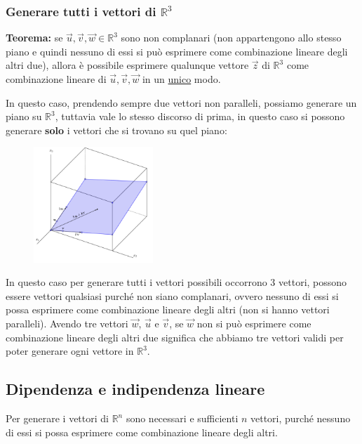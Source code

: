 \documentclass[../main.tex]{subfiles}
\begin{document}
\pagebreak
\subsubsection{Generare tutti i vettori di $\mathbb{R}^3$}
\textbf{Teorema:} se $\vec{u},\vec{v},\vec{w} \in \mathbb{R}^3$ sono non complanari (non appartengono allo stesso piano e quindi nessuno di essi si può  esprimere come combinazione lineare degli altri due), allora è possibile esprimere qualunque vettore $\vec{z}$ di $\mathbb{R}^3$ come combinazione lineare di $\vec{u},\vec{v},\vec{w}$ in un \underline{unico} modo.

In questo caso, prendendo sempre due vettori non paralleli, possiamo generare un piano su $\mathbb{R}^3$, tuttavia vale lo stesso discorso di prima, in questo caso si possono generare \textbf{solo} i vettori che si trovano su quel piano:
\begin{figure}[h]
    \centering
    \includegraphics[width=0.4\textwidth]{../images/combinazioneLineareR3.png}
\end{figure}

In questo caso per generare tutti i vettori possibili occorrono 3 vettori, possono essere vettori qualsiasi purché non siano complanari, ovvero nessuno di essi si possa esprimere come combinazione lineare degli altri (non si hanno vettori paralleli). Avendo tre vettori $\vec{w}$, $\vec{u}$ e $\vec{v}$, se $\vec{w}$ non si può esprimere come combinazione lineare degli altri due significa che abbiamo tre vettori validi per poter generare ogni vettore in $\mathbb{R}^3$.

\vspace{1.5cm}
\subsection{Dipendenza e indipendenza lineare}
Per generare i vettori di $\mathbb{R}^n$ sono necessari e sufficienti $n$ vettori, purché nessuno di essi si possa esprimere come combinazione lineare degli altri.
\end{document}
